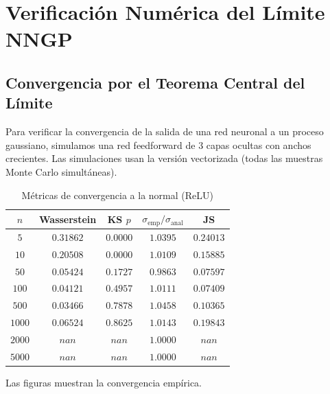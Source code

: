 \section{Verificación Numérica del Límite NNGP}
\subsection{Convergencia por el Teorema Central del Límite}

Para verificar la convergencia de la salida de una red neuronal
a un proceso gaussiano, simulamos una red feedforward de 3 capas ocultas
con anchos crecientes. Las simulaciones usan la versión vectorizada
(todas las muestras Monte Carlo simultáneas).

\begin{table}[h]
\centering
\caption{Métricas de convergencia a la normal (ReLU)}
\label{tab:convergence}
\begin{tabular}{c|cccc}
\toprule
$n$ & Wasserstein & KS $p$ & $\sigma_{\text{emp}}/\sigma_{\text{anal}}$ & JS \\
\midrule
  $5$ & $0.31862$ & $0.0000$ & $1.0395$ & $0.24013$ \\
  $10$ & $0.20508$ & $0.0000$ & $1.0109$ & $0.15885$ \\
  $50$ & $0.05424$ & $0.1727$ & $0.9863$ & $0.07597$ \\
  $100$ & $0.04121$ & $0.4957$ & $1.0111$ & $0.07409$ \\
  $500$ & $0.03466$ & $0.7878$ & $1.0458$ & $0.10365$ \\
  $1000$ & $0.06524$ & $0.8625$ & $1.0143$ & $0.19843$ \\
  $2000$ & $nan$ & $nan$ & $1.0000$ & $nan$ \\
  $5000$ & $nan$ & $nan$ & $1.0000$ & $nan$ \\
\bottomrule
\end{tabular}
\end{table}

Las figuras muestran la convergencia empírica.